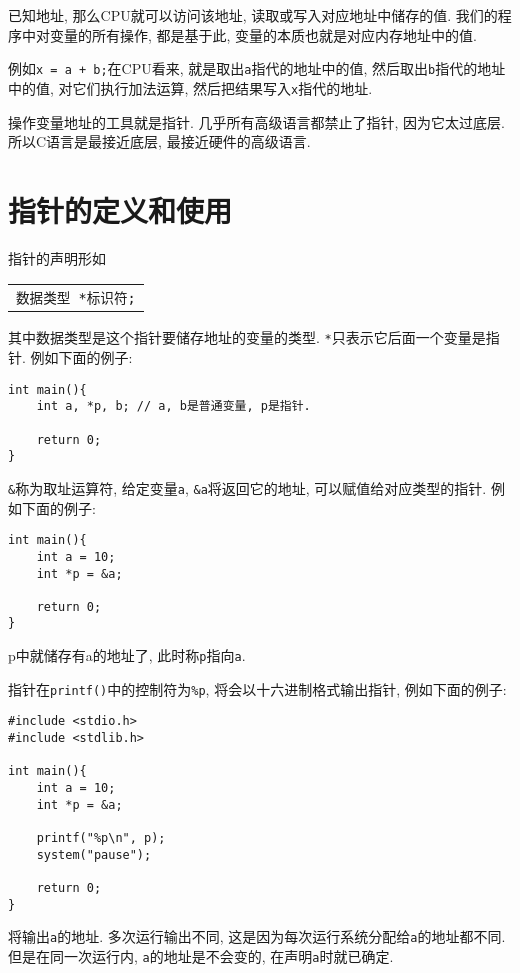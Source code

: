         已知地址, 那么CPU就可以访问该地址, 读取或写入对应地址中储存的值. 我们的程序中对变量的所有操作, 都是基于此, 变量的本质也就是对应内存地址中的值.

        例如\texttt{x = a + b;}在CPU看来, 就是取出\texttt{a}指代的地址中的值, 然后取出\texttt{b}指代的地址中的值, 对它们执行加法运算, 然后把结果写入\texttt{x}指代的地址.

        操作变量地址的工具就是指针. 几乎所有高级语言都禁止了指针, 因为它太过底层. 所以C语言是最接近底层, 最接近硬件的高级语言.

    \section{指针的定义和使用}
        指针的声明形如
        \begin{center}
        \begin{longtable}{l}
            \texttt{数据类型 *\hspace*{-0.25pt}标识符\hspace*{-0.25pt};}
        \end{longtable}
        \end{center}

        其中数据类型是这个指针要储存地址的变量的类型. \texttt{*}只表示它后面一个变量是指针. 例如下面的例子:
\begin{lstlisting}
int main(){
    int a, *p, b; // a, b是普通变量, p是指针.

    return 0;
}
\end{lstlisting}

        \texttt{\&}称为取址运算符, 给定变量\texttt{a}, \texttt{\&a}将返回它的地址, 可以赋值给对应类型的指针. 例如下面的例子:
\begin{lstlisting}
int main(){
    int a = 10;
    int *p = &a;

    return 0;
}
\end{lstlisting}

        p中就储存有a的地址了, 此时称\texttt{p}指向\texttt{a}.

        指针在\texttt{printf()}中的控制符为\texttt{\%p}, 将会以十六进制格式输出指针, 例如下面的例子:
\begin{lstlisting}
#include <stdio.h>
#include <stdlib.h>

int main(){
    int a = 10;
    int *p = &a;

    printf("%p\n", p);
    system("pause");

    return 0;
}
\end{lstlisting}
        将输出\texttt{a}的地址. 多次运行输出不同, 这是因为每次运行系统分配给\texttt{a}的地址都不同. 但是在同一次运行内, \texttt{a}的地址是不会变的, 在声明\texttt{a}时就已确定.

